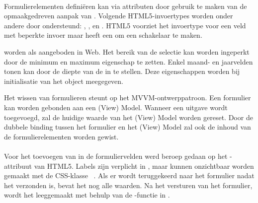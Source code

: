 \paragraph{\kendo}
 Formulierelementen definiëren kan via attributen door gebruik te maken van de opmaakgedreven aanpak van \kendo.
 Volgende HTML5-invoertypes worden onder andere door \kendo{} ondersteund:  , ,  en .
 HTML5 voorziet het invoertype  voor een veld met beperkte invoer maar \kendo{} heeft een  om een schakelaar te maken.

  worden als  aangeboden in \kendo{} Web.
 Het bereik van de selectie kan worden ingeperkt door de minimum en maximum eigenschap te zetten.
 Enkel maand- en jaarvelden tonen kan door de diepte van de  in te stellen.
 Deze eigenschappen worden bij initialisatie van het object meegegeven.
 
 Het wissen van formulieren steunt op het MVVM-ontwerppatroon.
 Een formulier kan worden gebonden aan een (View) Model.
 Wanneer een uitgave wordt toegevoegd, zal de huidige waarde van het (View) Model worden gereset.
 Door de dubbele binding tussen het formulier en het (View) Model zal ook de inhoud van de formulierelementen worden gewist.
 
\paragraph{\jqm} 
Voor het toevoegen van  in de formuliervelden werd beroep gedaan op het -attribuut van HTML5. 
Labels zijn verplicht in \jqm{}, maar kunnen onzichtbaar worden gemaakt met de CSS-klasse ~\cite{JQuery2013}. 
Als er wordt teruggekeerd naar het formulier nadat het verzonden is, bevat het nog alle waarden. 
Na het versturen van het formulier, wordt het leeggemaakt met behulp van de -functie in \js{}.
 
